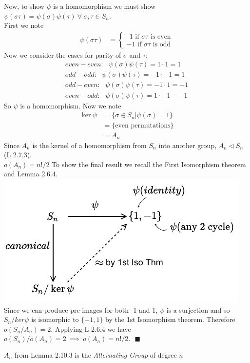 \begin{lemma}
\noindent Now, to show $\psi$ is a homomorphism we must show $\psi(\sigma\tau)=\psi(\sigma)\psi(\tau) \ \forall \ \sigma,\tau\in S_n$. \\
\noindent First we note 
\begin{align}
    \psi(\sigma\tau) &= \begin{cases}
      \ \ 1 \text{ if $\sigma\tau$ is even} \\
      -1\text{ if $\sigma\tau$ is odd} 
    \end{cases} \nonumber
\end{align}
Now we consider the cases for parity of $\sigma$ and $\tau$:
\begin{align}
    even-even: \ \ \ \psi(\sigma)\psi(\tau)=1\cdot 1 = 1 \nonumber \\
    odd-odd: \ \ \ \psi(\sigma)\psi(\tau)=-1 \cdot -1 = 1 \nonumber \\
    odd-even: \ \ \ \psi(\sigma)\psi(\tau)=-1\cdot 1 = -1 \nonumber \\
    even-odd: \ \ \ \psi(\sigma)\psi(\tau)=1\cdot -1 - -1 \nonumber
\end{align}
So $\psi$ is a homomorphism. Now we note 
\begin{align}
    \ker\psi &= \{\sigma \in S_n | \psi(\sigma) = 1\} \nonumber \\
    &=\{\text{even permutations}\} \nonumber \\
    &= A_n \nonumber
\end{align}
Since $A_n$ is the kernel of a homomorphism from $S_n$ into another group, $A_n \triangleleft S_n$ (L 2.7.3). \\
\noindent $\boxed{o(A_n)=n!/2}$ To show the final result we recall the First Isomorphism theorem and Lemma 2.6.4. \includegraphics[]{Figures/Lem2-10-3.pdf} \\
Since we can produce pre-images for both -1 and 1, $\psi$ is a surjection and so $S_n/ker\psi$ is isomorphic to $\{-1,1\}$ by the 1st Isomorphism theorem. Therefore $o(S_n/A_n)= 2$. Applying L 2.6.4 we have $o(S_n)/o(A_n)=2 \ \implies \ o(A_n)=n!/2. \ \ \ \blacksquare $
\end{lemma}
\begin{definition}
$A_n$ from Lemma 2.10.3 is the \textit{Alternating Group} of degree $n$
\end{definition}

